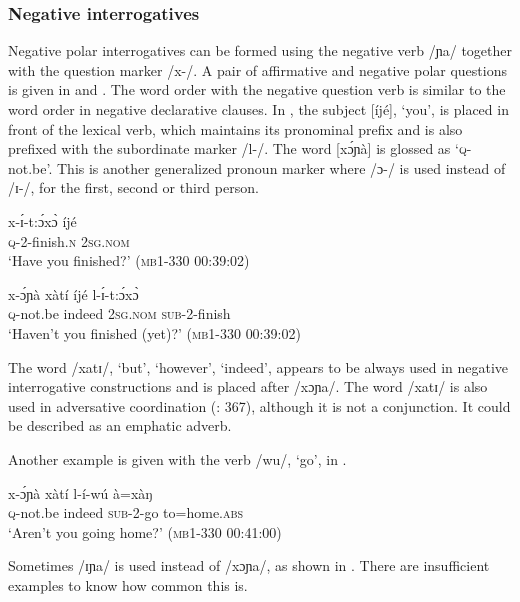 \documentclass[output=paper,colorlinks,citecolor=brown,draftmode]{langscibook}
\begin{document}
\subsubsection{Negative interrogatives}
\label{sec:lop:2.2.2}
Negative polar interrogatives can be formed using the negative verb /ɲa/ together with the question marker /x-/. A pair of affirmative and negative polar questions is given in  and . The word order with the negative question verb is similar to the word order in negative declarative clauses.  In , the subject [íjé], ‘you’, is placed in front of the lexical verb, which maintains its pronominal prefix and is also prefixed with the subordinate marker /l-/.  The word [xɔ́ɲà] is glossed as ‘\textsc{q}{}-not.be’. This is another generalized pronoun marker where /ɔ-/ is used instead of /ɪ-/, for the first, second or third person.

\ea\label{ex:lop:21}
        \gll x-ɪ́-t:ɔ́xɔ̀ íjé \\ 
             \textsc{q}{}-2-finish.\textsc{n} 2\textsc{sg.nom} \\
        \glt ‘Have you finished?’    (\textsc{mb1-330} \textsc{00:}39:02)
\z

\ea\label{ex:lop:22}
        \gll x-ɔ́ɲà  xàtí íjé l-ɪ́-t:ɔ́xɔ̀ \\ 
             \textsc{q}{}-not.be indeed 2\textsc{sg.nom} \textsc{sub}{}-2-finish \\
        \glt ‘Haven’t you finished (yet)?’   (\textsc{mb1-330} \textsc{00:}39:02)
\z

The word /xatɪ/, ‘but’, ‘however’, ‘indeed’, appears to be always used in negative interrogative constructions and is placed after /xɔɲa/. The word /xatɪ/ is also used in adversative coordination (\citealt{MoodieBillington2020}: 367), although it is not a conjunction. It could be described as an emphatic adverb.

Another example is given with the verb /wu/, ‘go’, in .

\ea\label{ex:lop:23}
        \gll x-ɔ́ɲà  xàtí l-í-wú à=xàŋ \\ 
             \textsc{q}{}-not.be indeed \textsc{sub}{}-2-go to=home.\textsc{abs} \\
        \glt ‘Aren’t you going home?’   (\textsc{mb1-330} \textsc{00:}41:00)
\z

Sometimes /ɪɲa/ is used instead of /xɔɲa/, as shown in . There are insufficient examples to know how common this is.
\end{document}
